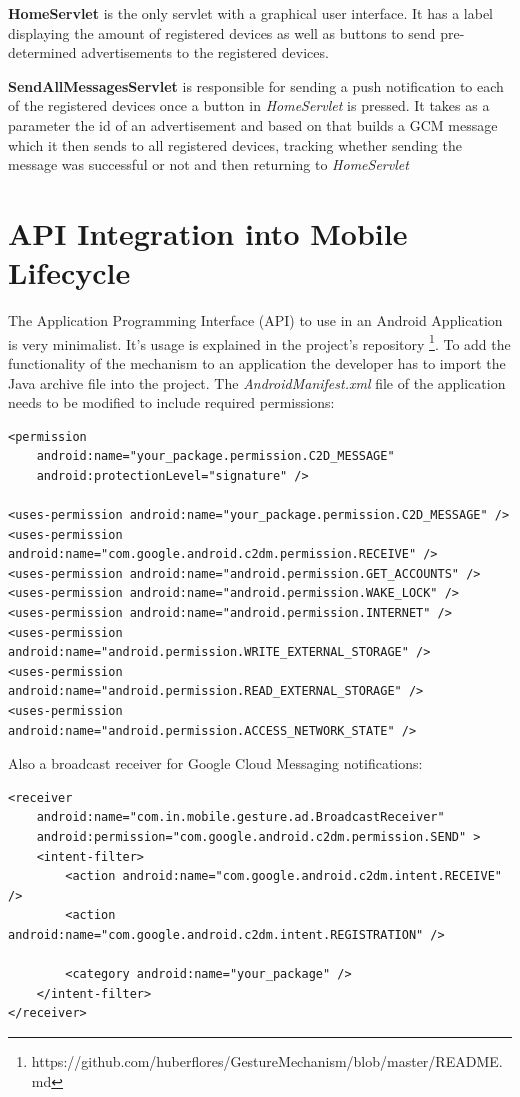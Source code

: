 \textbf{HomeServlet} is the only servlet with a graphical user interface. It has a label displaying the amount of registered devices as well as buttons to send pre-determined advertisements to the registered devices.

\textbf{SendAllMessagesServlet} is responsible for sending a push notification to each of the registered devices once a button in \textit{HomeServlet} is pressed. It takes as a parameter the id of an advertisement and based on that builds a GCM message which it then sends to all registered devices, tracking whether sending the message was successful or not and then returning to \textit{HomeServlet}

\section{API Integration into Mobile Lifecycle}

The Application Programming Interface (API) to use in an Android Application is very minimalist. It's usage is explained in the project's repository \footnote{https://github.com/huberflores/GestureMechanism/blob/master/README.md}. To add the functionality of the mechanism to an application the developer has to import the Java archive file into the project. The \textit{AndroidManifest.xml} file of the application needs to be modified to include required permissions:

\lstset{language=XML}
\begin{lstlisting}
<permission
    android:name="your_package.permission.C2D_MESSAGE"
    android:protectionLevel="signature" />

<uses-permission android:name="your_package.permission.C2D_MESSAGE" />
<uses-permission android:name="com.google.android.c2dm.permission.RECEIVE" />
<uses-permission android:name="android.permission.GET_ACCOUNTS" />
<uses-permission android:name="android.permission.WAKE_LOCK" />
<uses-permission android:name="android.permission.INTERNET" />
<uses-permission android:name="android.permission.WRITE_EXTERNAL_STORAGE" />
<uses-permission android:name="android.permission.READ_EXTERNAL_STORAGE" />
<uses-permission android:name="android.permission.ACCESS_NETWORK_STATE" />
\end{lstlisting}

Also a broadcast receiver for Google Cloud Messaging notifications:

\begin{lstlisting}
<receiver
    android:name="com.in.mobile.gesture.ad.BroadcastReceiver"
    android:permission="com.google.android.c2dm.permission.SEND" >
    <intent-filter>
        <action android:name="com.google.android.c2dm.intent.RECEIVE" />
        <action android:name="com.google.android.c2dm.intent.REGISTRATION" />

        <category android:name="your_package" />
    </intent-filter>
</receiver>
\end{lstlisting}

